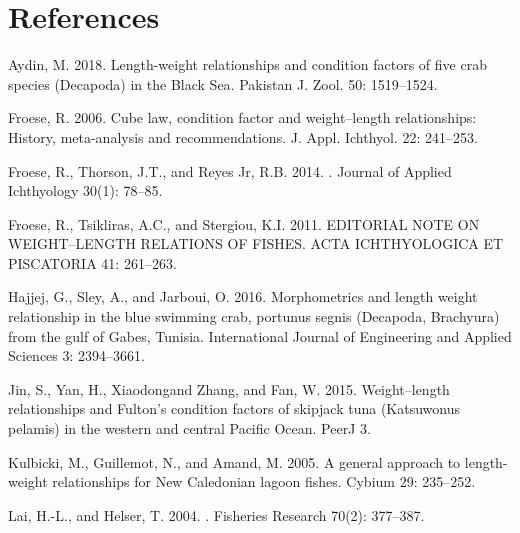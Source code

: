 \documentclass[12pt]{article}\usepackage[]{graphicx}\usepackage[]{color}
\begin{document}
\clearpage

\section{References}\label{references}

\noindent \vspace{-2em} \setlength{\parindent}{-0.2in} \setlength{\leftskip}{0.2in} \setlength{\parskip}{8pt}

\label{refs}
\begin{CSLReferences}{1}{0}
Aydin, M. 2018. Length-weight relationships and condition factors of five crab species ({D}ecapoda) in the {B}lack {S}ea. Pakistan J. Zool. 50: 1519--1524.

Froese, R. 2006. Cube law, condition factor and weight--length relationships: History, meta-analysis and recommendations. J. Appl. Ichthyol. 22: 241--253.

Froese, R., Thorson, J.T., and Reyes Jr, R.B. 2014. . Journal of Applied Ichthyology 30(1): 78--85.

Froese, R., Tsikliras, A.C., and Stergiou, K.I. 2011. EDITORIAL NOTE ON WEIGHT--LENGTH RELATIONS OF FISHES. ACTA ICHTHYOLOGICA ET PISCATORIA 41: 261--263.

Hajjej, G., Sley, A., and Jarboui, O. 2016. Morphometrics and length weight relationship in the blue swimming crab, portunus segnis ({D}ecapoda, {B}rachyura) from the gulf of {G}abes, {T}unisia. International Journal of Engineering and Applied Sciences 3: 2394--3661.

Jin, S., Yan, H., Xiaodongand Zhang, and Fan, W. 2015. Weight--length relationships and {F}ulton's condition factors of skipjack tuna ({K}atsuwonus pelamis) in the western and central {P}acific {O}cean. PeerJ 3.

Kulbicki, M., Guillemot, N., and Amand, M. 2005. A general approach to length-weight relationships for {N}ew {C}aledonian lagoon fishes. Cybium 29: 235--252.

Lai, H.-L., and Helser, T. 2004. . Fisheries Research 70(2): 377--387.


\end{CSLReferences}
\end{document}
